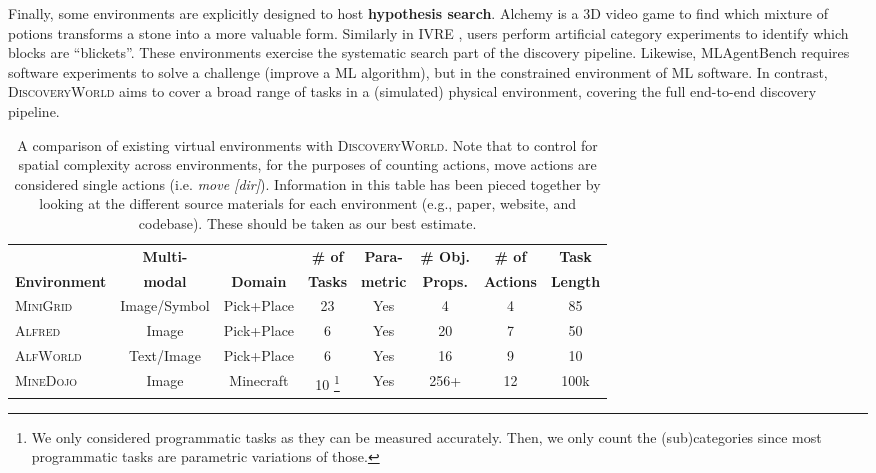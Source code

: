 \documentclass{article}
\newcommand\blfootnote[1]{%
  \begingroup
  \renewcommand\thefootnote{$\dagger$}\footnote{#1}%
  \addtocounter{footnote}{-1}%
  \endgroup
}
\newcommand{\env}{\textsc{DiscoveryWorld}\xspace}
\begin{document}
Finally, some environments are explicitly designed to host {\bf hypothesis search}.
Alchemy \citep{wang2021alchemy} is a 3D video game to find which mixture of potions transforms a stone into a more valuable form.
Similarly in IVRE \citep{xu2023interactive}, users perform artificial category experiments to identify which blocks are ``blickets''.
These environments exercise the systematic search part of the discovery pipeline.
Likewise, MLAgentBench  \citep{Huang2023MLAgentBenchEL} requires software experiments to solve a
challenge (improve a ML algorithm), but in the constrained environment
of ML software. In contrast, \env aims to cover a broad range of tasks
in a (simulated) physical environment, covering the full end-to-end
discovery pipeline.




\begin{savenotes}
\begin{table}[t]
\centering
\scriptsize
\caption{\footnotesize A comparison of existing virtual environments with \env. Note that to control for spatial complexity across environments, for the purposes of counting actions, move actions are considered single actions (i.e. \textit{move [dir]}). Information in this table has been pieced together by looking at the different source materials for each environment (e.g., paper, website, and codebase). These should be taken as our best estimate.}
\label{tab:env_comparison}
\begin{tabular}{lccccccc}
\toprule
\textbf{}               &   \textbf{Multi-}    &   \textbf{} &   \textbf{\# of}  &            \textbf{Para-}           &   \textbf{\# Obj.}  & \textbf{\# of}   & \textbf{Task}  \\
\textbf{Environment}    &   \textbf{modal}    &   \textbf{Domain} &   \textbf{Tasks}  &   \textbf{metric} &   \textbf{Props.}  & \textbf{Actions}   & \textbf{Length}  \\
\midrule
\rowcolor[HTML]{F3F3F3} 
\textsc{MiniGrid}~\citep{MinigridMiniworld23}       &   Image/Symbol           & Pick+Place            &  23    & Yes     & 4     & 4     &   85       \\
\textsc{Alfred}~\citep{ALFRED20}         &   Image        & Pick+Place            &  6    & Yes   & 20     & 7     &   50       \\
\rowcolor[HTML]{F3F3F3} 
\textsc{AlfWorld}~\citep{Shridhar2020ALFWorldAT}       &   Text/Image    & Pick+Place            &  6    & Yes   & 16     & 9     &   10       \\
\textsc{MineDojo}~\citep{fan2022minedojo}       &   Image        & Minecraft             &   10\blfootnote{We only considered programmatic tasks as they can be measured accurately. Then, we only count the (sub)categories since most programmatic tasks are parametric variations of those.} & Yes     & 256+     & 12    &   100k     \\

\end{tabular}
\end{table}
\end{savenotes}
\end{document}
